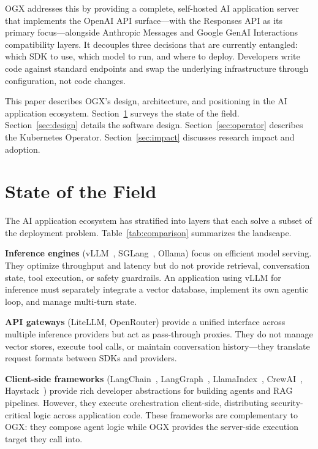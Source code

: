 \documentclass[11pt]{article}
\begin{document}
OGX addresses this by providing a complete, self-hosted AI application server that implements the OpenAI API surface---with the Responses API as its primary focus---alongside Anthropic Messages and Google GenAI Interactions compatibility layers. It decouples three decisions that are currently entangled: which SDK to use, which model to run, and where to deploy. Developers write code against standard endpoints and swap the underlying infrastructure through configuration, not code changes.

This paper describes OGX's design, architecture, and positioning in the AI application ecosystem. Section~\ref{sec:field} surveys the state of the field. Section~\ref{sec:design} details the software design. Section~\ref{sec:operator} describes the Kubernetes Operator. Section~\ref{sec:impact} discusses research impact and adoption.

\section{State of the Field}
\label{sec:field}

The AI application ecosystem has stratified into layers that each solve a subset of the deployment problem. Table~\ref{tab:comparison} summarizes the landscape.

\textbf{Inference engines} (vLLM~\cite{kwon2023vllm}, SGLang~\cite{sglang}, Ollama) focus on efficient model serving. They optimize throughput and latency but do not provide retrieval, conversation state, tool execution, or safety guardrails. An application using vLLM for inference must separately integrate a vector database, implement its own agentic loop, and manage multi-turn state.

\textbf{API gateways} (LiteLLM, OpenRouter) provide a unified interface across multiple inference providers but act as pass-through proxies. They do not manage vector stores, execute tool calls, or maintain conversation history---they translate request formats between SDKs and providers.

\textbf{Client-side frameworks} (LangChain~\cite{langchain}, LangGraph~\cite{langgraph}, LlamaIndex~\cite{llamaindex}, CrewAI~\cite{crewai}, Haystack~\cite{haystack}) provide rich developer abstractions for building agents and RAG pipelines. However, they execute orchestration client-side, distributing security-critical logic across application code. These frameworks are complementary to OGX: they compose agent logic while OGX provides the server-side execution target they call into.
\end{document}
